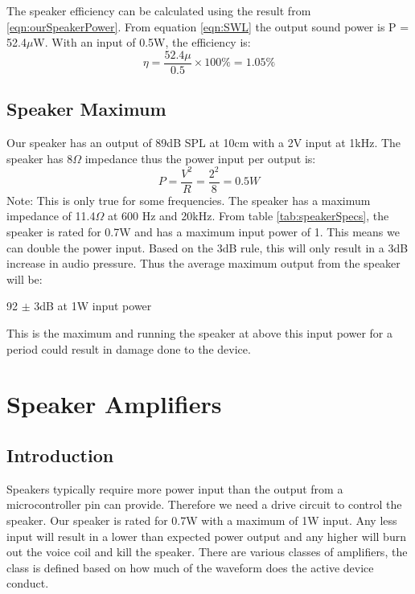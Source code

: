 \documentclass[12pt, a4paper]{article}
\begin{document}
	The speaker efficiency can be calculated using the result from \ref{eqn:ourSpeakerPower}. From equation \ref{eqn:SWL} the output sound power is P = 52.4$\mu$W. With an input of 0.5W, the efficiency is:
	\begin{equation*}
		\eta = \frac{52.4\mu}{0.5}\times 100\% = 1.05\%
	\end{equation*}
	
	\pagebreak
	\subsection{Speaker Maximum}
	Our speaker has an output of 89dB SPL at 10cm with a 2V input at 1kHz. The speaker has 8$\Omega$ impedance thus the power input per output is:
	\begin{equation}
		P = \frac{V^2}{R} = \frac{2^2}{8} = 0.5W
	\end{equation}
	Note: This is only true for some frequencies. The speaker has a maximum impedance of 11.4$\Omega$ at 600 Hz and 20kHz.  
	From table \ref{tab:speakerSpecs}, the speaker is rated for 0.7W and has a maximum input power of 1. This means we can double the power input. Based on the 3dB rule, this will only result in a 3dB increase in audio pressure\cite{speakerPowerDistance}. Thus the average maximum output from the speaker will be:
	\begin{center}
		92 $\pm$ 3dB at 1W input power
	\end{center}
	This is the maximum and running the speaker at above this input power for a period could result in damage done to the device. 
	\pagebreak
	\section{Speaker Amplifiers}

	\subsection{Introduction}
	Speakers typically require more power input than the output from a microcontroller pin can provide. Therefore we need a drive circuit to control the speaker. Our speaker is rated for 0.7W with a maximum of 1W input. Any less input will result in a lower than expected power output and any higher will burn out the voice coil and kill the speaker. There are various classes of amplifiers, the class is defined based on how much of the waveform does the active device conduct.
\end{document}
